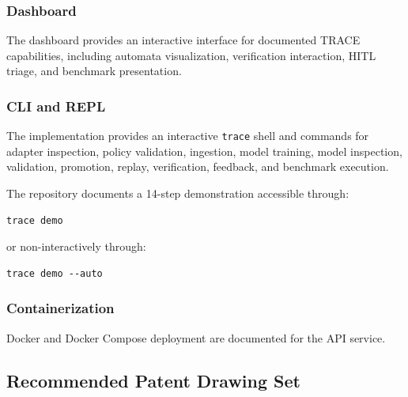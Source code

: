 \documentclass[11pt,a4paper]{article}
\begin{document}
\subsubsection*{Dashboard}

The dashboard provides an interactive interface for documented TRACE capabilities,
including automata visualization, verification interaction, HITL triage, and benchmark
presentation.

\subsubsection*{CLI and REPL}

The implementation provides an interactive \texttt{trace} shell and commands for adapter
inspection, policy validation, ingestion, model training, model inspection, validation,
promotion, replay, verification, feedback, and benchmark execution.

The repository documents a 14-step demonstration accessible through:

\begin{verbatim}
trace demo
\end{verbatim}

or non-interactively through:

\begin{verbatim}
trace demo --auto
\end{verbatim}

\subsubsection*{Containerization}

Docker and Docker Compose deployment are documented for the API service.

\subsection{Recommended Patent Drawing Set}
\end{document}
